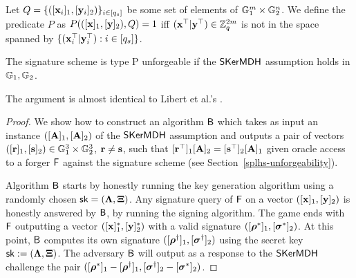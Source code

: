 Let $Q=\{ ([\mathbf{x}_i]_1,[\mathbf{y}_i]_2) \}_{i \in [q_s]}$ be some set of elements of $\mathbb{G}_1^{m} \times \mathbb{G}_2^n$. We define the predicate $P$ as $P(([\mathbf{x}]_1,[\mathbf{y}]_2),Q)=1$ iff $(\mathbf{x}^{\top}|\mathbf{y}^{\top}) \in \mathbb{Z}_q^{2m}$ is not in the space spanned by $\{(\mathbf{x}_i^{\top}|\mathbf{y}_i^{\top}) :i \in [q_s]\}$. 

\begin{theorem} The signature scheme is type P unforgeable if the $\mathsf{SKerMDH}$ assumption holds in $\mathbb{G}_1,\mathbb{G}_2$.
\end{theorem}
The argument is almost identical to Libert et al.'s \cite{C:LPJY13}.
\begin{proof} We show how to construct an algorithm $\mathsf{B}$ which takes as input an instance $([\mathbf{{A}}]_1,[\mathbf{{A}}]_2)$ of the $\mathsf{SKerMDH}$ assumption and outputs a pair of vectors $([\mathbf{r}]_1,[\mathbf{s}]_2) \in \mathbb{G}_1^{3} \times \mathbb{G}_2^{3}$, $\mathbf{r} \neq \mathbf{s}$, such that 
$[\mathbf{r}^{\top}]_1 [\mathbf{{A}}]_2=[\mathbf{s}^{\top}]_2 [\mathbf{{A}}]_1$ given oracle access to a forger $\mathsf{F}$ against the signature scheme
(see Section~\ref{splhs-unforgeability}). 

Algorithm $\mathsf{B}$ starts by honestly running the key generation algorithm 
using a randomly chosen $\mathsf{sk}=(\mathbf{{\Lambda}},\mathbf{{\Xi}})$. Any signature query of $\mathsf{F}$ on a vector
$([\mathbf{x}]_1,[\mathbf{y}]_2)$ is honestly answered by $\mathsf{B}$, by running the signing algorithm.
The game ends with $\mathsf{F}$ outputting a vector $([\mathbf{x}]_1^*,[\mathbf{y}]_2^*)$ 
with a valid signature $([{\boldsymbol \rho}^{*}]_1, [{\boldsymbol \sigma}^{*}]_2)$. At this point, $\mathsf{B}$ computes its own signature $([{\boldsymbol \rho}^{\dagger}]_1, [{\boldsymbol \sigma}^{\dagger}]_2)$ using the secret key $\mathsf{sk}:=(\mathbf{{\Lambda}},\mathbf{{\Xi}})$. The adversary $\mathsf{B}$ will output as a response to the $\mathsf{SKerMDH}$ challenge the pair $([{\boldsymbol \rho}^{*}]_1-[{\boldsymbol \rho}^{\dagger}]_1,[ {\boldsymbol \sigma}^{\dagger}]_2-[{\boldsymbol \sigma}^{*}]_2)$.


\end{proof}
